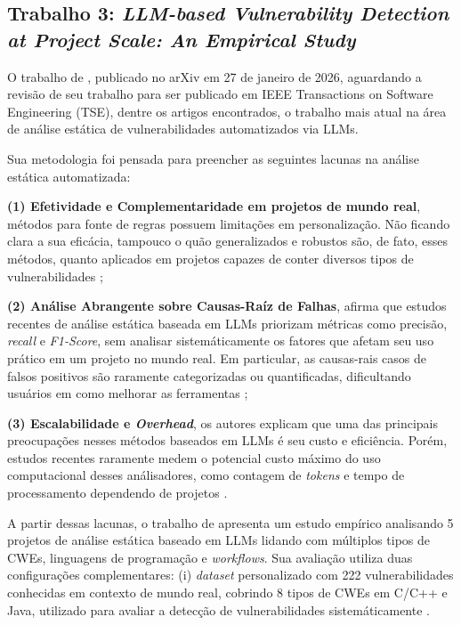 \documentclass[
    12pt,                %
    openright,           %
    oneside,             %
    a4paper,             %
    english,             %
    brazil               %
]{abntex2}
\begin{document}
\subsection{Trabalho 3: \textit{LLM-based Vulnerability Detection at Project Scale: An Empirical Study} \cite{li2026llmbased}}
\par
O trabalho de , publicado no arXiv em 27 de janeiro de 2026, aguardando a revisão de seu trabalho para ser publicado em IEEE Transactions on Software Engineering (TSE), dentre os artigos encontrados, o trabalho mais atual na área de análise estática de vulnerabilidades automatizados via LLMs.
\par
Sua metodologia foi pensada para preencher as seguintes lacunas na análise estática automatizada: 
\par
\textbf{(1) Efetividade e Complementaridade em projetos de mundo real}, métodos para fonte de regras possuem limitações em personalização. 
Não ficando clara a sua eficácia, tampouco o quão generalizados e robustos são, de fato, esses métodos, quanto aplicados em projetos capazes de conter diversos tipos de vulnerabilidades \cite{li2026llmbased};
\par
\textbf{(2) Análise Abrangente sobre Causas-Raíz de Falhas},  afirma que estudos recentes de análise estática baseada em LLMs priorizam métricas como precisão, \textit{recall} e \textit{F1-Score}, sem analisar sistemáticamente os fatores que afetam seu uso prático em um projeto no mundo real.
Em particular, as causas-rais casos de falsos positivos são raramente categorizadas ou quantificadas, dificultando usuários em como melhorar as ferramentas \cite{li2026llmbased};
\par
\textbf{(3) Escalabilidade e \textit{Overhead}}, os autores explicam que uma das principais preocupações nesses métodos baseados em LLMs é seu custo e eficiência.
Porém, estudos recentes raramente medem o potencial custo máximo do uso computacional desses análisadores, como contagem de \textit{tokens} e tempo de processamento dependendo de projetos \cite{li2026llmbased}.
\par
A partir dessas lacunas, o trabalho de  apresenta um estudo empírico analisando 5 projetos de análise estática baseado em LLMs lidando com múltiplos tipos de CWEs, linguagens de programação e \textit{workflows}.
Sua avaliação utiliza duas configurações complementares: (i) \textit{dataset} personalizado com 222 vulnerabilidades conhecidas em contexto de mundo real, cobrindo 8 tipos de CWEs em C/C++ e Java, utilizado para avaliar a detecção de vulnerabilidades sistemáticamente \cite{li2026llmbased}.
\end{document}
